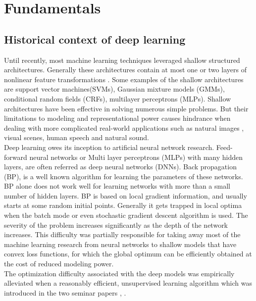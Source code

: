 	
	\chapter{Fundamentals }\label{chapter:02_fundamentals}
	

	\section{Historical context of deep learning }
	Until recently, most machine learning techniques leveraged shallow structured architectures. Generally these architectures contain at most one or two layers of nonlinear feature transformations \cite{Deng:2014:DLM:2692917.2692918}. Some examples of the shallow architectures are support vector machines(SVMs), Gaussian mixture models (GMMs), conditional random fields (CRFs), multilayer perceptrons (MLPs). 
	Shallow architectures have been effective in solving numerous simple problems. But their limitations to modeling and representational power causes hindrance when dealing with more complicated real-world applications such as natural images , visual scenes, human speech and natural sound. 
	\\
 Deep learning owes its inception to artificial neural network research. Feed-forward neural networks or Multi layer perceptrons (MLPs) with many hidden layers, are often referred as deep neural networks (DNNs). Back propagation (BP), is a well known algorithm for learning the parameters of these networks. BP alone does not work well for learning networks with more than a small number of hidden layers. 
	BP is based on local gradient information, and usually starts at some random initial points. Generally it gets trapped in local optima when the batch mode or even stochastic gradient descent algorithm is used. The severity of the problem increases significantly as the depth of the network increases. This difficulty was partially responsible for taking away most of the machine learning research from neural networks to shallow models that have convex loss functions, for which the global optimum can be efficiently obtained at the cost of reduced modeling  power. \\
	 The optimization difficulty associated with the deep models was empirically alleviated when a reasonably efficient, unsupervised learning algorithm which was introduced in the two seminar papers \cite{Hinton06afast}, \cite{HintonSalakhutdinov2006b}. 
